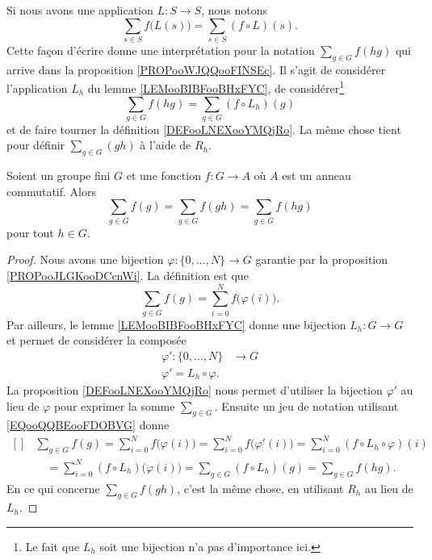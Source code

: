 Si nous avons une application \( L\colon S\to S\), nous notons
\begin{equation}
    \sum_{s\in S}f\big( L(s) \big)=\sum_{s\in S}(f\circ L)(s).
\end{equation}
Cette façon d'écrire donne une interprétation pour la notation \( \sum_{g\in G}f(hg)\) qui arrive dans la proposition \ref{PROPooWJQQooFINSEc}. Il s'agit de considérer l'application \( L_h\) du lemme \ref{LEMooBIBFooBHxFYC}, de considérer\footnote{Le fait que \( L_h\) soit une bijection n'a pas d'importance ici.}
\begin{equation}        \label{EQooQQBEooFDOBVG}
    \sum_{g\in G}f(hg)=\sum_{g\in G}(f\circ L_h)(g)
\end{equation}
et de faire tourner la définition \ref{DEFooLNEXooYMQjRo}. La même chose tient pour définir \( \sum_{g\in G}(gh)\) à l'aide de \( R_h\).

\begin{proposition}     \label{PROPooWJQQooFINSEc}
    Soient un groupe fini \( G\) et une fonction \( f\colon G\to A\) où \( A\) est un anneau commutatif. Alors
    \begin{equation}
        \sum_{g\in G}f(g)=\sum_{g\in G}f(gh)=\sum_{g\in G}f(hg)
    \end{equation}
    pour tout \( h\in G\).
\end{proposition}

\begin{proof}
    Nous avons une bijection \( \varphi\colon \{ 0,\ldots,  N \}\to G\) garantie par la proposition \ref{PROPooJLGKooDCcnWi}. La définition est que
    \begin{equation}
        \sum_{g\in G}f(g)=\sum_{i=0}^Nf\big( \varphi(i) \big).
    \end{equation}
    Par ailleurs, le lemme \ref{LEMooBIBFooBHxFYC} donne une bijection \( L_h\colon G\to G\) et permet de considérer la composée
    \begin{equation}
        \begin{aligned}
            \varphi'\colon \{ 0,\ldots,  N \}&\to G \\
            \varphi'=L_h\circ \varphi.
        \end{aligned}
    \end{equation}
    La proposition \ref{DEFooLNEXooYMQjRo} nous permet d'utiliser la bijection \( \varphi'\) au lieu de \( \varphi\) pour exprimer la somme \( \sum_{g\in G}\). Ensuite un jeu de notation utilisant \eqref{EQooQQBEooFDOBVG} donne
    \begin{equation}
        \begin{aligned}[]
            &\sum_{g\in G}f(g)=\sum_{i=0}^Nf\big( \varphi(i) \big)=\sum_{i=0}^Nf\big( \varphi'(i) \big)=\sum_{i=0}^N(f\circ L_h\circ \varphi)(i)\\
            &\quad=\sum_{i=0}^N(f\circ L_h)\big( \varphi(i) \big)=\sum_{g\in G}(f\circ L_h)(g)=\sum_{g\in G}f(hg).
        \end{aligned}
    \end{equation}
    En ce qui concerne \( \sum_{g\in G}f(gh)\), c'est la même chose, en utilisant \( R_h\) au lieu de \( L_h\).
\end{proof}

